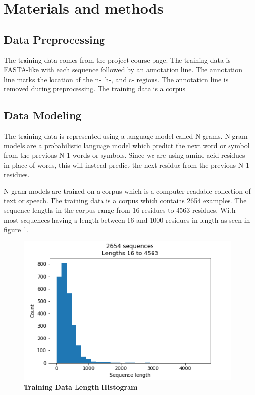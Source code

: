 \documentclass[10pt,letterpaper]{article}
\begin{document}
	\section*{Materials and methods}
	\subsection*{Data Preprocessing}
	The training data comes from the project course page. The training data is FASTA-like with each sequence followed by an annotation line.  The annotation line marks the location of the n-, h-, and c- regions. The annotation line is removed during preprocessing. The training data is a corpus
	
	\subsection*{Data Modeling}
	The training data is represented using a language model called N-grams. N-gram models are a probabilistic language model which predict the next word or symbol from the previous N-1 words or symbols. Since we are using amino acid residues in place of words, this will instead predict the next residue from the previous N-1 residues. 

	N-gram models are trained on a corpus which is a computer readable collection of text or speech\cite{jurafsky}. The training data is a corpus which contains 2654 examples. The sequence lengths in the corpus range from 16 residues to 4563 residues. With most sequences having a length between 16 and 1000 residues in length as seen in figure \ref{fig:sequence-hist}. 
	
	\begin{figure}[h]
		\centering
		\includegraphics[scale=0.5, width=\textwidth]{sequence-hist}
		\caption{{\bf Training Data Length Histogram}}
		\label{fig:sequence-hist}
	\end{figure}
	
\end{document}
